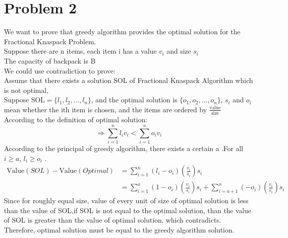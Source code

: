 \documentclass[a4paper,12pt]{journal}
\begin{document}
\section*{Problem 2}
We want to prove that greedy algorithm provides the optimal solution for the Fractional Knaspack Problem.\\
Suppose there are n items, each item i has a value $v_i$ and size $s_i$\\
The capacity of backpack is B\\
We could use contradiction to prove:\\
Assume that there exists a solution SOL of Fractional Knaspack Algorithm which is not optimal, \\
Suppose $\text{SOL}=\{l_1,l_2,...,l_n\}$, and the optimal solution is $\{o_1,o_2,...,o_n\}$, $s_i$ and $o_i$ mean whether the ith item is chosen, and the items are ordered by $\frac{\text{value}}{\text{size}}$\\
According to the definition of optimal solution:
$$\Rightarrow \sum_{i=1}^{n}l_iv_i<\sum_{i=1}^{n}o_iv_i$$
According to the principal of greedy algorithm, there exists a certain a .For all $i\geq a$,  $l_i\geq o_i$ .\\

	\begin{align}
		\text{Value}(SOL)-\text{Value}(Optimal)&=\sum_{i=1}^{n}(l_i-o_i)(\frac{v_i}{s_i})s_i\\
		&=\sum_{i=1}^{a}(1-o_i)(\frac{v_i}{s_i})s_i+\sum_{i=a+1}^{n}(-o_i)(\frac{v_i}{s_i})s_i
	\end{align}
Since for roughly equal size, value of every unit of size of optimal solution is less than the value of SOL,if SOL is not equal to the optimal solution, than the value of SOL is greater than the value of optimal solution, which contradicts. Therefore, optimal solution must be equal to the greedy algorithm solution. \\
\end{document}
